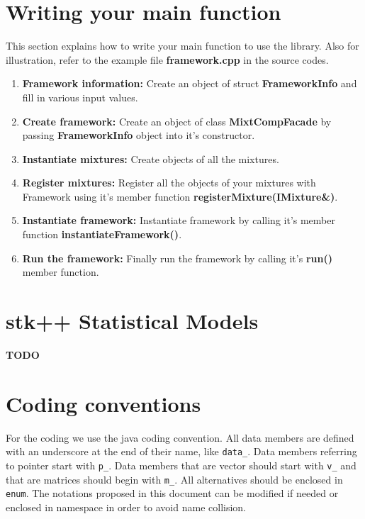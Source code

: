 \documentclass[a4paper,11pt]{article}
\begin{document}
\section{Writing your main function}
\label{mainfunction}
This section explains how to write your main function to use the library. Also for illustration, refer to the example file 
{\bf framework.cpp} in the source codes. 

\begin{enumerate}
\item {\bf Framework information:} Create an object of struct {\bf FrameworkInfo} and fill in various input values.
\item {\bf Create framework:} Create an object of class {\bf MixtCompFacade} by passing {\bf FrameworkInfo} object into it's constructor.
\item {\bf Instantiate mixtures:} Create objects of all the mixtures.
\item {\bf Register mixtures:} Register all the objects of your mixtures with Framework using it's member function {\bf registerMixture(IMixture\&)}.
\item {\bf Instantiate framework:} Instantiate framework by calling it's member function {\bf instantiateFramework()}.
\item {\bf Run the framework:} Finally run the framework by calling it's {\bf run()} member function.
\end{enumerate}


\section{stk++ Statistical Models}

{\bf TODO}

\appendix

\section{Coding conventions}

For the coding we use the java coding convention. All data members
are defined with an underscore at the end of their name, like \verb+data_+.
Data members referring to pointer start with \verb+p_+.
Data members that are vector should start with \verb+v_+ and that are matrices should begin with \verb+m_+.
All alternatives should be enclosed in \verb+enum+.
The notations proposed in this document can be modified if needed
or enclosed in namespace in order to avoid name collision.
\end{document}
